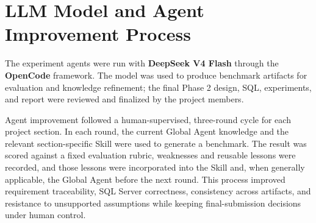 \section{LLM Model and Agent Improvement Process}

The experiment agents were run with \textbf{DeepSeek V4 Flash} through the \textbf{OpenCode} framework. The model was used to produce benchmark artifacts for evaluation and knowledge refinement; the final Phase 2 design, SQL, experiments, and report were reviewed and finalized by the project members.

Agent improvement followed a human-supervised, three-round cycle for each project section. In each round, the current Global Agent knowledge and the relevant section-specific Skill were used to generate a benchmark. The result was scored against a fixed evaluation rubric, weaknesses and reusable lessons were recorded, and those lessons were incorporated into the Skill and, when generally applicable, the Global Agent before the next round. This process improved requirement traceability, SQL Server correctness, consistency across artifacts, and resistance to unsupported assumptions while keeping final-submission decisions under human control.
